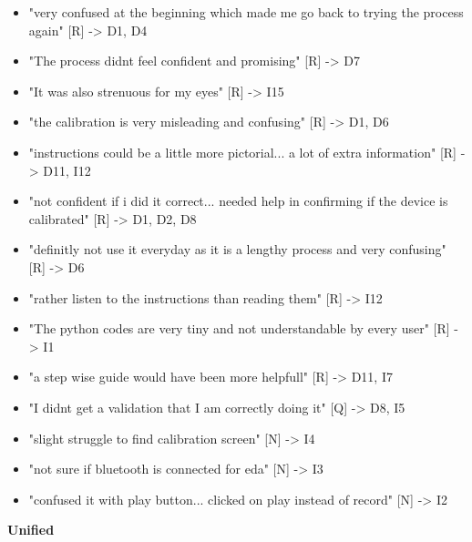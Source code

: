 \documentclass[
]{article}
\begin{document}
\begin{itemize}
\item
  "very confused at the beginning which made me go back to trying the process again" {[}R{]} -\textgreater{} D1, D4
\item
  "The process didnt feel confident and promising" {[}R{]} -\textgreater{} D7
\item
  "It was also strenuous for my eyes" {[}R{]} -\textgreater{} I15
\item
  "the calibration is very misleading and confusing" {[}R{]} -\textgreater{} D1, D6
\item
  "instructions could be a little more pictorial... a lot of extra information" {[}R{]} -\textgreater{} D11, I12
\item
  "not confident if i did it correct... needed help in confirming if the device is calibrated" {[}R{]} -\textgreater{} D1, D2, D8
\item
  "definitly not use it everyday as it is a lengthy process and very confusing" {[}R{]} -\textgreater{} D6
\item
  "rather listen to the instructions than reading them" {[}R{]} -\textgreater{} I12
\item
  "The python codes are very tiny and not understandable by every user" {[}R{]} -\textgreater{} I1
\item
  "a step wise guide would have been more helpfull" {[}R{]} -\textgreater{} D11, I7
\item
  "I didnt get a validation that I am correctly doing it" {[}Q{]} -\textgreater{} D8, I5
\item
  "slight struggle to find calibration screen" {[}N{]} -\textgreater{} I4
\item
  "not sure if bluetooth is connected for eda" {[}N{]} -\textgreater{} I3
\item
  "confused it with play button... clicked on play instead of record" {[}N{]} -\textgreater{} I2
\end{itemize}

\textbf{Unified}
\end{document}
